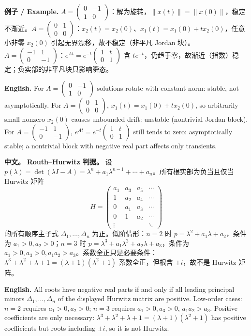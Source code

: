 \documentclass[UTF8,11pt,a4paper]{ctexart}
\newcommand{\EN}[1]{\par\noindent\textbf{English.} #1\par}
\newcommand{\EX}[2]{\par\noindent\textbf{例子 / Example.} #1\par\EN{#2}}
\newcommand{\APS}[2]{\par\noindent\textbf{中文。} #1\par\noindent\textbf{English.} #2\par}
\newcommand{\norm}[1]{\lVert #1\rVert}\newcommand{\abs}[1]{\lvert #1\rvert}
\begin{document}
\EX{$A=\begin{pmatrix}0&-1\\1&0\end{pmatrix}$：解为旋转，$\norm{x(t)}=\norm{x(0)}$，稳定不渐近。$A=\begin{pmatrix}0&1\\0&0\end{pmatrix}$：$x_2(t)=x_2(0)$、$x_1(t)=x_1(0)+tx_2(0)$，任意小非零 $x_2(0)$ 引起无界漂移，故不稳定（非平凡 Jordan 块）。$A=\begin{pmatrix}-1&1\\0&-1\end{pmatrix}$：$e^{At}=e^{-t}\begin{pmatrix}1&t\\0&1\end{pmatrix}$ 含 $te^{-t}$，仍趋于零，故渐近（指数）稳定；负实部的非平凡块只影响瞬态。}{For $A=\begin{pmatrix}0&-1\\1&0\end{pmatrix}$ solutions rotate with constant norm: stable, not asymptotically. For $A=\begin{pmatrix}0&1\\0&0\end{pmatrix}$, $x_1(t)=x_1(0)+tx_2(0)$, so arbitrarily small nonzero $x_2(0)$ causes unbounded drift: unstable (nontrivial Jordan block). For $A=\begin{pmatrix}-1&1\\0&-1\end{pmatrix}$, $e^{At}=e^{-t}\begin{pmatrix}1&t\\0&1\end{pmatrix}$ still tends to zero: asymptotically stable; a nontrivial block with negative real part affects only transients.}

\APS{\textbf{Routh--Hurwitz 判据。} 设 $p(\lambda)=\det(\lambda I-A)=\lambda^n+a_1\lambda^{n-1}+\cdots+a_n$。所有根实部为负当且仅当 Hurwitz 矩阵
\[
H=\begin{pmatrix}
a_1&a_3&a_5&\cdots\\
1&a_2&a_4&\cdots\\
0&a_1&a_3&\cdots\\
0&1&a_2&\cdots\\
\vdots&&&\ddots
\end{pmatrix}
\]
的所有顺序主子式 $\Delta_1,\ldots,\Delta_n$ 为正。低阶情形：$n=2$ 时 $p=\lambda^2+a_1\lambda+a_2$，条件为 $a_1>0,a_2>0$；$n=3$ 时 $p=\lambda^3+a_1\lambda^2+a_2\lambda+a_3$，条件为 $a_1>0,a_3>0,a_1a_2>a_3$。系数全正只是必要条件：$\lambda^3+\lambda^2+\lambda+1=(\lambda+1)(\lambda^2+1)$ 系数全正，但根含 $\pm i$，故不是 Hurwitz 矩阵。}{All roots have negative real parts if and only if all leading principal minors $\Delta_1,\ldots,\Delta_n$ of the displayed Hurwitz matrix are positive. Low-order cases: $n=2$ requires $a_1>0,a_2>0$; $n=3$ requires $a_1>0,a_3>0$, $a_1a_2>a_3$. Positive coefficients are only necessary: $\lambda^3+\lambda^2+\lambda+1=(\lambda+1)(\lambda^2+1)$ has positive coefficients but roots including $\pm i$, so it is not Hurwitz.}
\end{document}
